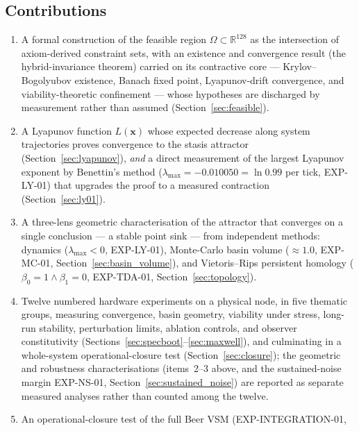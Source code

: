 \documentclass[11pt, a4paper]{article}
\newcommand{\R}{\mathbb{R}}
\newcommand{\sv}{\bm{x}}
\begin{document}
\subsection{Contributions}

\begin{enumerate}
  \item A formal construction of the feasible region $\Omega \subset \R^{128}$
        as the intersection of axiom-derived constraint sets, with an existence
        and convergence result (the hybrid-invariance theorem) carried on its
        contractive core --- Krylov--Bogolyubov existence, Banach fixed point,
        Lyapunov-drift convergence, and viability-theoretic confinement ---
        whose hypotheses are
        discharged by measurement rather than assumed
        (Section~\ref{sec:feasible}).
  \item A Lyapunov function $L(\sv)$ whose expected decrease along
        system trajectories proves convergence to the stasis attractor
        (Section~\ref{sec:lyapunov}), \emph{and} a direct measurement of the
        largest Lyapunov exponent by Benettin's method
        ($\lambda_\text{max} = -0.010050 = \ln 0.99$ per tick, EXP-LY-01)
        that upgrades the proof to a measured contraction
        (Section~\ref{sec:ly01}).
  \item A three-lens geometric characterisation of the attractor that
        converges on a single conclusion --- a stable point sink --- from
        independent methods: dynamics ($\lambda_\text{max}<0$, EXP-LY-01),
        Monte-Carlo basin volume ($\approx 1.0$, EXP-MC-01,
        Section~\ref{sec:basin_volume}), and Vietoris--Rips persistent homology
        ($\beta_0=1 \wedge \beta_1=0$, EXP-TDA-01, Section~\ref{sec:topology}).
  \item Twelve numbered hardware experiments on a physical node, in five thematic
        groups, measuring convergence, basin geometry, viability under stress,
        long-run stability, perturbation limits, ablation controls, and
        observer constitutivity
        (Sections~\ref{sec:specboot}--\ref{sec:maxwell}), and culminating in a
        whole-system operational-closure test (Section~\ref{sec:closure}); the
        geometric and robustness characterisations (items~2--3 above, and the
        sustained-noise margin EXP-NS-01, Section~\ref{sec:sustained_noise}) are
        reported as separate measured analyses rather than counted among the twelve.
  \item An operational-closure test of the full Beer VSM (EXP-INTEGRATION-01,

\end{enumerate}
\end{document}
